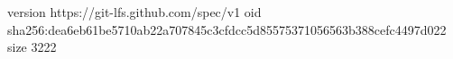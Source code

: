 version https://git-lfs.github.com/spec/v1
oid sha256:dea6eb61be5710ab22a707845c3cfdcc5d85575371056563b388cefc4497d022
size 3222
